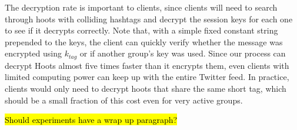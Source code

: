 The decryption rate is important to clients, since clients will need to
search through hoots with colliding hashtags and decrypt the session
keys for each one to see if it decrypts correctly. Note that, with a
simple fixed constant string prepended to the keys, the client can
quickly verify whether the message was encrypted using $k_{tag}$ or if
another group's key was used. Since our process can decrypt Hoots almost
five times faster than it encrypts them, even clients with limited
computing power can keep up with the entire Twitter feed. In practice,
clients would only need to decrypt hoots that share the same short tag,
which should be a small fraction of this cost even for very active
groups.


\hl{Should experiments have a wrap up paragraph?}


